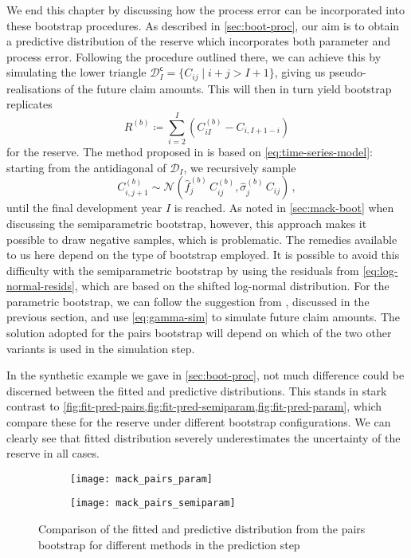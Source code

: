 \documentclass[a4paper]{book}
\begin{document}
We end this chapter by discussing how the process error can be incorporated into these bootstrap procedures. As described in \cref{sec:boot-proc}, our aim is to obtain a predictive distribution of the reserve which incorporates both parameter and process error. Following the procedure outlined there, we can achieve this by simulating the lower triangle $\mathcal{D}^{\mathsf{c}}_I = \{ C_{ij} \mid i + j > I + 1 \}$, giving us pseudo-realisations of the future claim amounts. This will then in turn yield bootstrap replicates
\begin{equation}
  R^{(b)} \coloneqq \sum_{i = 2}^I (C^{(b)}_{iI} - C_{i, I + 1 - i})
\end{equation}
for the reserve. The method proposed in \cite{england:dist} is based on \eqref{eq:time-series-model}: starting from the antidiagonal of $\mathcal{D}_I$, we recursively sample
\begin{equation} \label{eq:normal-sampling}
  C^{(b)}_{i, j + 1} \sim \mathcal{N}(\widehat{f}^{(b)}_j \, C^{(b)}_{ij}, \widehat{\sigma}^{(b)}_j \, C_{ij}) \,,
\end{equation}
\noindent until the final development year $I$ is reached. As noted in \cref{sec:mack-boot} when discussing the semiparametric bootstrap, however, this approach makes it possible to draw negative samples, which is problematic. The remedies available to us here depend on the type of bootstrap employed. It is possible to avoid this difficulty with the semiparametric bootstrap by using the residuals from \cref{eq:log-normal-resids}, which are based on the shifted log-normal distribution. For the parametric bootstrap, we can follow the suggestion from \cite{england:dist}, discussed in the previous section, and use \cref{eq:gamma-sim} to simulate future claim amounts. The solution adopted for the pairs bootstrap will depend on which of the two other variants is used in the simulation step.

In the synthetic example we gave in \cref{sec:boot-proc}, not much difference could be discerned between the fitted and predictive distributions. This stands in stark contrast to \cref{fig:fit-pred-pairs,fig:fit-pred-semiparam,fig:fit-pred-param}, which compare these for the reserve under different bootstrap configurations. We can clearly see that fitted distribution severely underestimates the uncertainty of the reserve in all cases.

\begin{figure}[!htb]
  \begin{subfigure}{0.45 \textwidth}
    \texttt{[image: mack\_pairs\_param]}
  \end{subfigure}
  \begin{subfigure}{0.45 \textwidth}
    \texttt{[image: mack\_pairs\_semiparam]}
  \end{subfigure}
  \caption{Comparison of the fitted and predictive distribution from the pairs bootstrap for different methods in the prediction step}
  \label{fig:fit-pred-pairs}
\end{figure}
\end{document}
